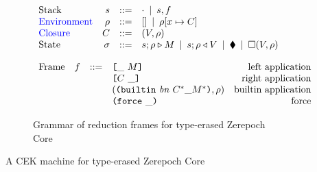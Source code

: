 \documentclass[../zerepoch-core-specification.tex]{subfiles}
\begin{document}
\begin{figure}[H]
\begin{subfigure}[c]{\linewidth}
    \centering
    \[\begin{array}{lrclr}
        \textrm{Stack} & s      & ::= & \cdot \enspace | \enspace s,f\\
 \textcolor{blue}{ \textrm{Environment}} & \rho & ::= & [] \enspace | \enspace \rho[x \mapsto C] \\
        \textcolor{blue}{ \textrm{Closure}} & C  & ::= & (V,\rho) \\
        \textrm{State} & \sigma & ::= & s;\rho \triangleright M \enspace | \enspace s;\rho \triangleleft V  \enspace | \enspace \blacklozenge{} \enspace | \enspace \square (V,\rho)\\
    \end{array}\]

    \label{fig:untyped-cek-frames}
\end{subfigure}
\begin{subfigure}[c]{\linewidth}
    \centering
    \[\begin{array}{lrclr}
        \textrm{Frame} & f  & ::=   & \texttt{[} \_ ~ M \texttt{]}                  & \textrm{left application}\\
                       &   &     & \texttt{[} C ~ \_ \texttt{]}                    & \textrm{right application}\\
                       &   &     & (\texttt{(} \texttt{builtin} ~ \mathit{bn} ~ C^* \_ M^* \texttt{)}, \rho)  & \textrm{builtin application}\\
                       &   &     & \texttt{(} \texttt{force} ~ \_ \texttt{)}                          & \textrm{force}
    \end{array}\]
    \caption{Grammar of reduction frames for type-erased Zerepoch Core}
    \label{fig:untyped-cek-reduction-frames}
\end{subfigure}
\caption{A CEK machine for type-erased Zerepoch Core}
\end{figure}
\end{document}
